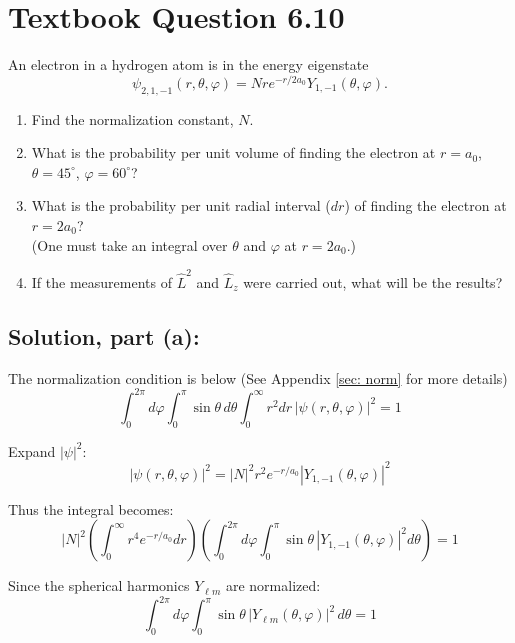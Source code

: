 \documentclass[12pt]{article}
\begin{document}
\section{Textbook Question 6.10}
    An electron in a hydrogen atom is in the energy eigenstate
    \[
        \psi_{2,1,-1}(r, \theta, \varphi) = N r e^{-r / 2a_0} Y_{1,-1}(\theta, \varphi).
    \]
    
    \begin{enumerate}
        \item[(a)] Find the normalization constant, \( N \).
        \item[(b)] What is the probability per unit volume of finding the electron at \( r = a_0 \), \( \theta = 45^\circ \), \( \varphi = 60^\circ \)?
        \item[(c)] What is the probability per unit radial interval (\( dr \)) of finding the electron at \( r = 2a_0 \)?\\
        (One must take an integral over \( \theta \) and \( \varphi \) at \( r = 2a_0 \).)
        \item[(d)] If the measurements of \( \hat{L}^2 \) and \( \hat{L}_z \) were carried out, what will be the results?
    \end{enumerate}


    \subsection{Solution, part (a):}
        The normalization condition is below (See Appendix \ref{sec: norm} for more details)
        \[
            \int_0^{2\pi} d\varphi \int_0^{\pi} \sin\theta \, d\theta \int_0^\infty r^2 dr \, |\psi(r,\theta,\varphi)|^2 = 1
        \]

        Expand \( |\psi|^2 \):
        \begin{equation} \label{eq: psi2}
            |\psi(r,\theta,\varphi)|^2 = |N|^2 r^2 e^{-r/a_0} |Y_{1,-1}(\theta,\varphi)|^2
        \end{equation}

        Thus the integral becomes:
        \[
            |N|^2 \left( \int_0^\infty r^4 e^{-r/a_0} dr \right) \left( \int_0^{2\pi} d\varphi \int_0^\pi \sin\theta \, |Y_{1,-1}(\theta,\varphi)|^2 d\theta \right) = 1
        \]

        Since the spherical harmonics \( Y_{\ell m} \) are normalized:
        \[
            \int_0^{2\pi} d\varphi \int_0^{\pi} \sin\theta \, |Y_{\ell m}(\theta,\varphi)|^2 \, d\theta = 1
        \]
\end{document}
